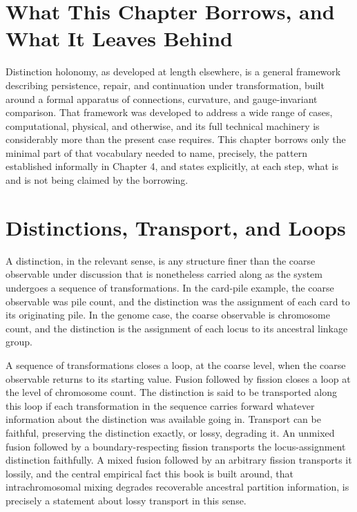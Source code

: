 \documentclass[11pt]{book}
\begin{document}
\section{What This Chapter Borrows, and What It Leaves Behind}

Distinction holonomy, as developed at length elsewhere, is a general framework describing persistence, repair, and continuation under transformation, built around a formal apparatus of connections, curvature, and gauge-invariant comparison. That framework was developed to address a wide range of cases, computational, physical, and otherwise, and its full technical machinery is considerably more than the present case requires. This chapter borrows only the minimal part of that vocabulary needed to name, precisely, the pattern established informally in Chapter 4, and states explicitly, at each step, what is and is not being claimed by the borrowing.

\section{Distinctions, Transport, and Loops}

A distinction, in the relevant sense, is any structure finer than the coarse observable under discussion that is nonetheless carried along as the system undergoes a sequence of transformations. In the card-pile example, the coarse observable was pile count, and the distinction was the assignment of each card to its originating pile. In the genome case, the coarse observable is chromosome count, and the distinction is the assignment of each locus to its ancestral linkage group.

A sequence of transformations closes a loop, at the coarse level, when the coarse observable returns to its starting value. Fusion followed by fission closes a loop at the level of chromosome count. The distinction is said to be transported along this loop if each transformation in the sequence carries forward whatever information about the distinction was available going in. Transport can be faithful, preserving the distinction exactly, or lossy, degrading it. An unmixed fusion followed by a boundary-respecting fission transports the locus-assignment distinction faithfully. A mixed fusion followed by an arbitrary fission transports it lossily, and the central empirical fact this book is built around, that intrachromosomal mixing degrades recoverable ancestral partition information, is precisely a statement about lossy transport in this sense.
\end{document}
